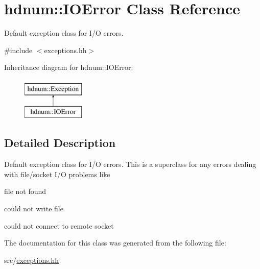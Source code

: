 \hypertarget{classhdnum_1_1IOError}{
\section{hdnum::IOError Class Reference}
\label{classhdnum_1_1IOError}
}


Default exception class for I/O errors.  




{\ttfamily \#include $<$exceptions.hh$>$}

Inheritance diagram for hdnum::IOError:\begin{figure}[H]
\begin{center}
\leavevmode
\includegraphics[height=2cm]{classhdnum_1_1IOError}
\end{center}
\end{figure}


\subsection{Detailed Description}
Default exception class for I/O errors. This is a superclass for any errors dealing with file/socket I/O problems like


\begin{DoxyItemize}
\item file not found
\item could not write file
\item could not connect to remote socket 
\end{DoxyItemize}

The documentation for this class was generated from the following file:\begin{DoxyCompactItemize}
\item 
src/\hyperlink{exceptions_8hh}{exceptions.hh}\end{DoxyCompactItemize}
